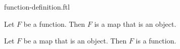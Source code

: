 \documentclass{stex}
\begin{document}
\begin{smodule}{function-definition.ftl}
  \begin{forthel}
    \begin{lemma}
      Let $F$ be a function.
      Then $F$ is a map that is an object.
    \end{lemma}
  \end{forthel}
  \begin{forthel}
    \begin{lemma}
      Let $F$ be a map that is an object.
      Then $F$ is a function.
    \end{lemma}
  \end{forthel}
\end{smodule}
\end{document}
